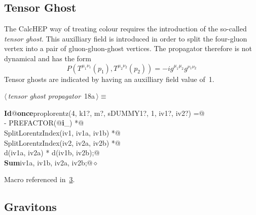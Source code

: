 \documentclass[a4paper,12pt]{amsart}
\renewcommand{\NWtarget}[2]{\hypertarget{#1}{#2}}
\renewcommand{\NWlink}[2]{\hyperlink{#1}{#2}}
\renewcommand{\NWtxtMacroRefIn}{Macro referenced in}
\renewcommand{\NWsep}{${\diamond}$}
\begin{document}
\subsection{Tensor Ghost}
The CalcHEP way of treating colour requires the introduction of
the so-called \textit{tensor ghost}. This auxilliary field is introduced
in order to split the four-gluon vertex into a pair of gluon-gluon-ghost
vertices. The propagator therefore is not dynamical and has the form
\begin{equation}
P(T^{\mu_1\nu_1}(p_1),T^{\mu_2\nu_2}(p_2))=-ig^{\mu_1\mu_2}g^{\nu_1\nu_2}
\end{equation}
Tensor ghosts are indicated by having an auxilliary field value of~1.
\begin{flushleft} \small
\begin{minipage}{\linewidth}\label{scrap37}\raggedright\small
\NWtarget{nuweb18a}{} $\langle\,${\itshape tensor ghost propagator}\nobreak\ {\footnotesize {18a}}$\,\rangle\equiv$
\vspace{-1ex}
\begin{list}{}{} \item
\mbox{}\verb@@\hbox{\sffamily\bfseries Id}\verb@ @\hbox{\sffamily\bfseries once}\verb@ proplorentz(4, k1?, m?, sDUMMY1?, 1, iv1?, iv2?) =@\\
\mbox{}\verb@   - PREFACTOR(@\hbox{\sffamily\bfseries i}\verb@_) *@\\
\mbox{}\verb@     SplitLorentzIndex(iv1, iv1a, iv1b) *@\\
\mbox{}\verb@     SplitLorentzIndex(iv2, iv2a, iv2b) *@\\
\mbox{}\verb@     d(iv1a, iv2a) * d(iv1b, iv2b);@\\
\mbox{}\verb@@\hbox{\sffamily\bfseries Sum}\verb@ iv1a, iv1b, iv2a, iv2b;@{\NWsep}
\end{list}
\vspace{-1.5ex}
\footnotesize
\begin{list}{}{\setlength{\itemsep}{-\parsep}\setlength{\itemindent}{-\leftmargin}}
\item \NWtxtMacroRefIn\ \NWlink{nuweb3}{3}.

\item{}
\end{list}
\end{minipage}\vspace{4ex}
\end{flushleft}
\subsection{Gravitons}
\end{document}

